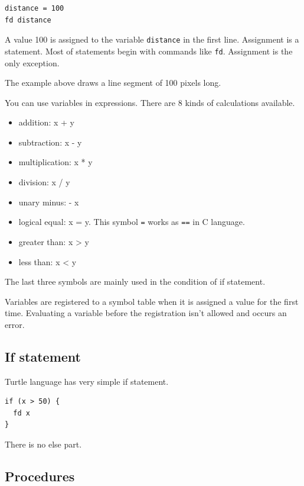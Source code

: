 \begin{lstlisting}
distance = 100
fd distance
\end{lstlisting}

A value 100 is assigned to the variable
\passthrough{\lstinline!distance!} in the first line. Assignment is a
statement. Most of statements begin with commands like
\passthrough{\lstinline!fd!}. Assignment is the only exception.

The example above draws a line segment of 100 pixels long.

You can use variables in expressions. There are 8 kinds of calculations
available.

\begin{itemize}
\tightlist
\item
  addition: x + y
\item
  subtraction: x - y
\item
  multiplication: x * y
\item
  division: x / y
\item
  unary minus: - x
\item
  logical equal: x = y. This symbol \passthrough{\lstinline!=!} works as
  \passthrough{\lstinline!==!} in C language.
\item
  greater than: x \textgreater{} y
\item
  less than: x \textless{} y
\end{itemize}

The last three symbols are mainly used in the condition of if statement.

Variables are registered to a symbol table when it is assigned a value
for the first time. Evaluating a variable before the registration isn't
allowed and occurs an error.

\hypertarget{if-statement}{%
\subsection{If statement}\label{if-statement}}

Turtle language has very simple if statement.

\begin{lstlisting}
if (x > 50) {
  fd x
}
\end{lstlisting}

There is no else part.

\hypertarget{procedures}{%
\subsection{Procedures}\label{procedures}}

